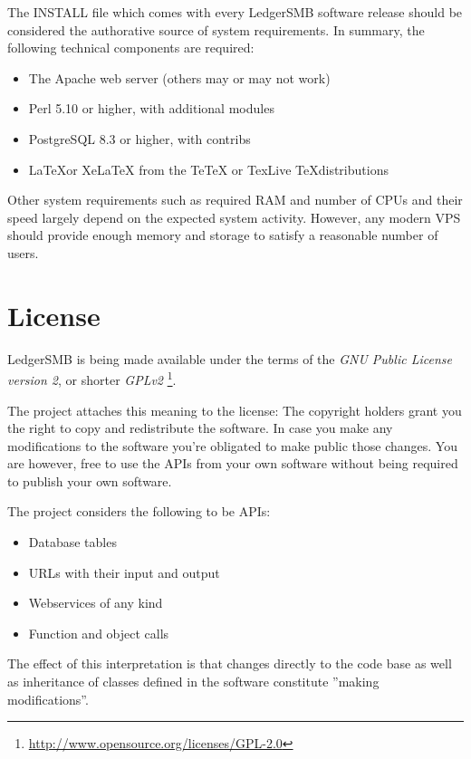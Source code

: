 The INSTALL file which comes with every LedgerSMB software release should be
considered the authorative source of system requirements. In summary, the
following technical components are required:

\begin{itemize}
\item The Apache web server (others may or may not work)
\item Perl 5.10 or higher, with additional modules
\item PostgreSQL 8.3 or higher, with contribs
\item \LaTeX or XeLaTeX from the TeTeX or TexLive \TeX distributions
\end{itemize}

Other system requirements such as required RAM and number of CPUs and their speed
largely depend on the expected system activity. However, any modern VPS should
provide enough memory and storage to satisfy a reasonable number of users.

\section{License}
\label{sec-ledgersmb-license}

LedgerSMB is being made available under the terms of the
\textit{GNU Public License version 2}, or shorter \textit{GPLv2}
\footnote{\url{http://www.opensource.org/licenses/GPL-2.0}}.

The project attaches this meaning to the license:
The copyright holders grant you the right to copy and
redistribute the software.  In case you make any modifications to the software
you're obligated to make public those changes.  You are however, free to use
the APIs from your own software without being required to publish your own software.

The project considers the following to be APIs:
\begin{itemize}
\item Database tables
\item URLs with their input and output
\item Webservices of any kind
\item Function and object calls
\end{itemize}

The effect of this interpretation is that changes directly to the code base as
well as inheritance of classes defined in the software constitute ''making modifications''.

